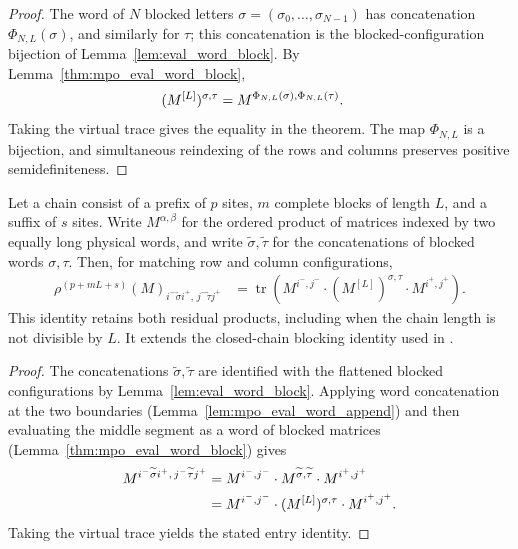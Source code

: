 \begin{proof}\leanok
    The word of $N$ blocked letters $\sigma=(\sigma_0,\ldots,\sigma_{N-1})$
    has concatenation $\Phi_{N,L}(\sigma)$, and similarly for $\tau$; this
    concatenation is the blocked-configuration bijection of
    Lemma~\ref{lem:eval_word_block}. By
    Lemma~\ref{thm:mpo_eval_word_block},
    \begin{align}
        (M^{[L]})^{\sigma,\tau}
         & =M^{\Phi_{N,L}(\sigma),\Phi_{N,L}(\tau)}.
        \notag
    \end{align}
    Taking the virtual trace gives the equality in the theorem. The map
    $\Phi_{N,L}$ is a bijection, and simultaneous reindexing of the rows and
    columns preserves positive semidefiniteness.
\end{proof}

\begin{lemma}
    \label{lem:mpdo_physical_blocking_residuals}
    \leanok
    Let a chain consist of a prefix of $p$ sites, $m$ complete blocks of
    length $L$, and a suffix of $s$ sites. Write $M^{\alpha,\beta}$ for the
    ordered product of matrices indexed by two equally long physical
    words, and write $\widetilde\sigma,\widetilde\tau$ for the concatenations of
    blocked words $\sigma,\tau$. Then, for matching row and column
    configurations,
    \begin{align}
        \rho^{(p+mL+s)}(M)_{i^-\widetilde\sigma i^+,\,
            j^-\widetilde\tau j^+}
         & =\operatorname{tr}\!\left(
        M^{i^-,j^-}\cdot (M^{[L]})^{\sigma,\tau}\cdot M^{i^+,j^+}
        \right).
    \end{align}
    This identity retains both residual products, including when the chain
    length is not divisible by $L$. It extends the closed-chain blocking
    identity used in
    \cite[Appendix~C.4, lines~1952--2017]{Cirac2016MPDO_arXiv}.
\end{lemma}

\begin{proof}\leanok
    The concatenations $\widetilde\sigma,\widetilde\tau$ are identified with
    the flattened blocked configurations by Lemma~\ref{lem:eval_word_block}.
    Applying word concatenation at the two boundaries
    (Lemma~\ref{lem:mpo_eval_word_append}) and then evaluating the middle
    segment as a word of blocked matrices (Lemma~\ref{thm:mpo_eval_word_block})
    gives
    \begin{align}
        M^{i^-\widetilde\sigma i^+,\,j^-\widetilde\tau j^+}
         & = M^{i^-,j^-}\cdot M^{\widetilde\sigma,\widetilde\tau}
        \cdot M^{i^+,j^+} \notag                                  \\
         & = M^{i^-,j^-}\cdot (M^{[L]})^{\sigma,\tau}
        \cdot M^{i^+,j^+}.
        \notag
    \end{align}
    Taking the virtual trace yields the stated entry identity.
\end{proof}

